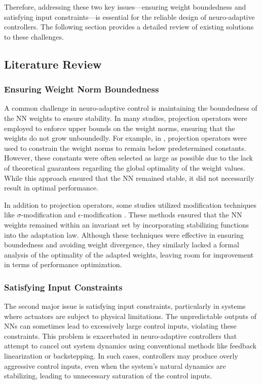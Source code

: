 \documentclass[lettersize,journal]{IEEEtran}
\begin{document}
Therefore, addressing these two key issues—ensuring weight boundedness and satisfying input constraints—is essential for the reliable design of neuro-adaptive controllers. 
The following section provides a detailed review of existing solutions to these challenges.

\subsection{Literature Review}

\subsubsection{Ensuring Weight Norm Boundedness}

A common challenge in neuro-adaptive control is maintaining the boundedness of the NN weights to ensure stability. 
In many studies, projection operators were employed to enforce upper bounds on the weight norms, ensuring that the weights do not grow unboundedly. 
For example, in \cite{Zhou:2023aa,Griffis:2023aa,Patil:2022aa}, projection operators were used to constrain the weight norms to remain below predetermined constants. 
However, these constants were often selected as large as possible due to the lack of theoretical guarantees regarding the global optimality of the weight values. 
While this approach ensured that the NN remained stable, it did not necessarily result in optimal performance.

In addition to projection operators, some studies utilized modification techniques like $\sigma$-modification \cite{Ge:2002aa} and $\epsilon$-modification \cite{Esfandiari:2015aa,Gao:2006aa}. 
These methods ensured that the NN weights remained within an invariant set by incorporating stabilizing functions into the adaptation law. 
Although these techniques were effective in ensuring boundedness and avoiding weight divergence, they similarly lacked a formal analysis of the optimality of the adapted weights, leaving room for improvement in terms of performance optimization.

\subsubsection{Satisfying Input Constraints}

The second major issue is satisfying input constraints, particularly in systems where actuators are subject to physical limitations. 
The unpredictable outputs of NNs can sometimes lead to excessively large control inputs, violating these constraints. 
This problem is exacerbated in neuro-adaptive controllers that attempt to cancel out system dynamics using conventional methods like feedback linearization or backstepping. 
In such cases, controllers may produce overly aggressive control inputs, even when the system's natural dynamics are stabilizing, leading to unnecessary saturation of the control inputs.
\end{document}
